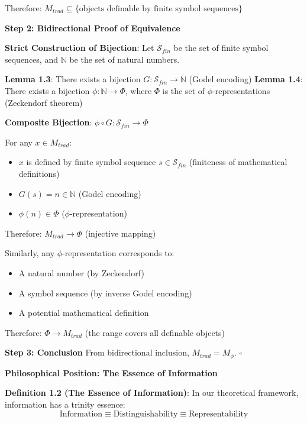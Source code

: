 Therefore: $M_{trad} \subseteq \{\text{objects definable by finite symbol sequences}\}$

\textbf{Step 2: Bidirectional Proof of Equivalence}

\textbf{Strict Construction of Bijection}:
Let $\mathcal{S}_{fin}$ be the set of finite symbol sequences, and $\mathbb{N}$ be the set of natural numbers.

\textbf{Lemma 1.3}: There exists a bijection $G: \mathcal{S}_{fin} \to \mathbb{N}$ (Godel encoding)
\label{lem:1.3}
\textbf{Lemma 1.4}: There exists a bijection $\phi: \mathbb{N} \to \Phi$, where $\Phi$ is the set of $\phi$-representations (Zeckendorf theorem)
\label{lem:1.4}

\textbf{Composite Bijection}: $\phi \circ G: \mathcal{S}_{fin} \to \Phi$

For any $x \in M_{trad}$:
\begin{itemize}
\item $x$ is defined by finite symbol sequence $s \in \mathcal{S}_{fin}$ (finiteness of mathematical definitions)
\item $G(s) = n \in \mathbb{N}$ (Godel encoding)
\item $\phi(n) \in \Phi$ ($\phi$-representation)
\end{itemize}

Therefore: $M_{trad} \to \Phi$ (injective mapping)

Similarly, any $\phi$-representation corresponds to:
\begin{itemize}
\item A natural number (by Zeckendorf)
\item A symbol sequence (by inverse Godel encoding)
\item A potential mathematical definition
\end{itemize}

Therefore: $\Phi \to M_{trad}$ (the range covers all definable objects)

\textbf{Step 3: Conclusion}
From bidirectional inclusion, $M_{trad} = M_\phi$. $\square$

\textbf{Philosophical Position: The Essence of Information}

\textbf{Definition 1.2 (The Essence of Information)}:
\label{def:1.2}
In our theoretical framework, information has a trinity essence:
\begin{equation}
\text{Information} \equiv \text{Distinguishability} \equiv \text{Representability}
\end{equation}

